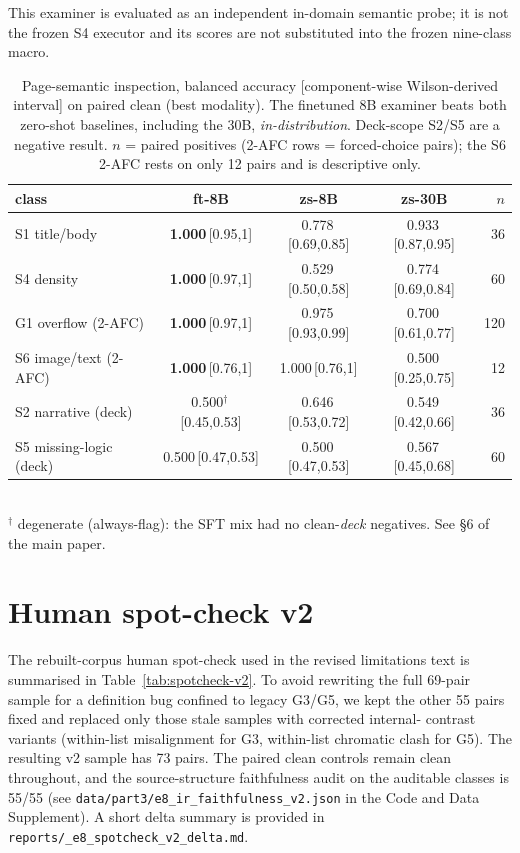 \documentclass[11pt]{article}
\newcommand{\g}[1]{\textsf{#1}}
\newcommand{\best}[1]{\textbf{#1}}
\newcommand{\ci}[1]{\,{\scriptsize[#1]}}
\begin{document}
This examiner is evaluated as an independent in-domain semantic probe; it is
not the frozen \g{S4} executor and its scores are not substituted into the
frozen nine-class macro.

\begin{table}[h]
\centering
\small
\caption{Page-semantic inspection, balanced accuracy [component-wise Wilson-derived interval] on paired
clean (best modality). The finetuned 8B examiner beats both zero-shot
baselines, including the 30B, \emph{in-distribution}. Deck-scope \g{S2}/\g{S5}
are a negative result. $n$ = paired positives (2-AFC rows = forced-choice
pairs); the \g{S6} 2-AFC rests on only 12 pairs and is descriptive only.}
\label{tab:examiner-full}
\begin{tabular}{@{}lcccr@{}}
\toprule
class & \textbf{ft-8B} & zs-8B & zs-30B & $n$ \\
\midrule
\g{S1} title/body  & \best{1.000}\ci{0.95,1} & 0.778\ci{0.69,0.85} & 0.933\ci{0.87,0.95} & 36 \\
\g{S4} density     & \best{1.000}\ci{0.97,1} & 0.529\ci{0.50,0.58} & 0.774\ci{0.69,0.84} & 60 \\
\g{G1} overflow (2-AFC) & \best{1.000}\ci{0.97,1} & 0.975\ci{0.93,0.99} & 0.700\ci{0.61,0.77} & 120 \\
\g{S6} image/text (2-AFC) & \best{1.000}\ci{0.76,1} & 1.000\ci{0.76,1} & 0.500\ci{0.25,0.75} & 12 \\
\midrule
\g{S2} narrative (deck) & 0.500$^\dagger$\ci{0.45,0.53} & 0.646\ci{0.53,0.72} & 0.549\ci{0.42,0.66} & 36 \\
\g{S5} missing-logic (deck) & 0.500\ci{0.47,0.53} & 0.500\ci{0.47,0.53} & 0.567\ci{0.45,0.68} & 60 \\
\bottomrule
\end{tabular}
\\[2pt]
{\footnotesize $^\dagger$ degenerate (always-flag): the SFT mix had no
clean-\emph{deck} negatives. See \S6 of the main paper.}
\end{table}

\section{Human spot-check v2}\label{app:spotcheckv2}

The rebuilt-corpus human spot-check used in the revised limitations text is
summarised in Table~\ref{tab:spotcheck-v2}. To avoid rewriting the full 69-pair
sample for a definition bug confined to legacy \g{G3}/\g{G5}, we kept the other
55 pairs fixed and replaced only those stale samples with corrected internal-
contrast variants (within-list misalignment for \g{G3}, within-list chromatic
clash for \g{G5}). The resulting v2 sample has 73 pairs. The paired clean
controls remain clean throughout, and the source-structure faithfulness audit on
the auditable classes is 55/55 (see \texttt{data/part3/e8\_ir\_faithfulness\_v2.json}
in the Code and Data Supplement). A short delta summary is provided in
\texttt{reports/\_e8\_spotcheck\_v2\_delta.md}.
\end{document}
